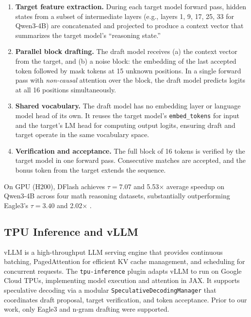 \documentclass[12pt,letterpaper]{article}
\begin{document}
\begin{enumerate}
    \item \textbf{Target feature extraction.} During each target model forward pass, hidden states from a subset of intermediate layers (e.g., layers 1, 9, 17, 25, 33 for Qwen3-4B) are concatenated and projected to produce a context vector that summarizes the target model's ``reasoning state.''
    \item \textbf{Parallel block drafting.} The draft model receives (a) the context vector from the target, and (b) a noise block: the embedding of the last accepted token followed by mask tokens at 15 unknown positions. In a single forward pass with \emph{non-causal} attention over the block, the draft model predicts logits at all 16 positions simultaneously.
    \item \textbf{Shared vocabulary.} The draft model has no embedding layer or language model head of its own. It reuses the target model's \texttt{embed\_tokens} for input and the target's LM head for computing output logits, ensuring draft and target operate in the same vocabulary space.
    \item \textbf{Verification and acceptance.} The full block of 16 tokens is verified by the target model in one forward pass. Consecutive matches are accepted, and the bonus token from the target extends the sequence.
\end{enumerate}

On GPU (H200), DFlash achieves $\tau=7.07$ and 5.53$\times$ average speedup on Qwen3-4B across four math reasoning datasets, substantially outperforming Eagle3's $\tau=3.40$ and 2.02$\times$ \citep{chen2026dflashblockdiffusionflash}.

\subsection{TPU Inference and vLLM}

vLLM \citep{kwon2023efficientmemorymanagementlarge} is a high-throughput LLM serving engine that provides continuous batching, PagedAttention for efficient KV cache management, and scheduling for concurrent requests. The \texttt{tpu-inference} plugin \citep{tpuinference} adapts vLLM to run on Google Cloud TPUs, implementing model execution and attention in JAX. It supports speculative decoding via a modular \texttt{SpeculativeDecodingManager} that coordinates draft proposal, target verification, and token acceptance. Prior to our work, only Eagle3 and n-gram drafting were supported.
\end{document}

